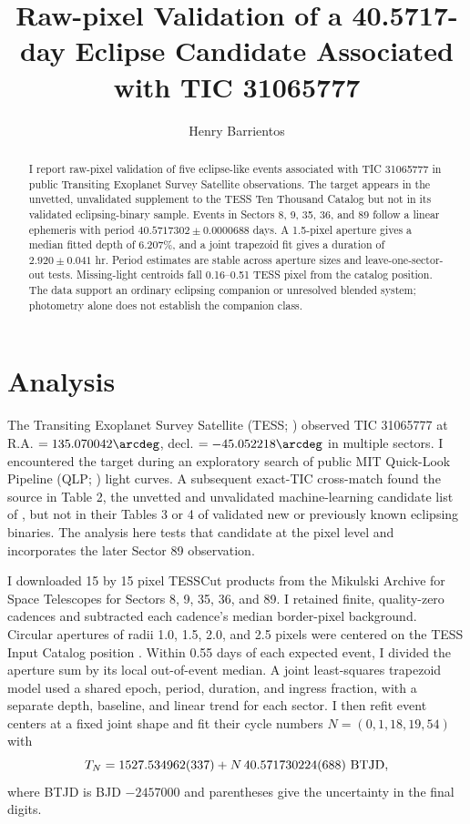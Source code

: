 \documentclass[default]{aastex702}
\begin{document}
\title{Raw-pixel Validation of a 40.5717-day Eclipse Candidate Associated with TIC 31065777}

\author[gname=Henry,sname=Barrientos]{Henry Barrientos}

\begin{abstract}
I report raw-pixel validation of five eclipse-like events associated with TIC 31065777 in public Transiting Exoplanet Survey Satellite observations. The target appears in the unvetted, unvalidated supplement to the TESS Ten Thousand Catalog but not in its validated eclipsing-binary sample. Events in Sectors 8, 9, 35, 36, and 89 follow a linear ephemeris with period $40.5717302 \pm 0.0000688$ days. A 1.5-pixel aperture gives a median fitted depth of 6.207\%, and a joint trapezoid fit gives a duration of $2.920 \pm 0.041$ hr. Period estimates are stable across aperture sizes and leave-one-sector-out tests. Missing-light centroids fall 0.16--0.51 TESS pixel from the catalog position. The data support an ordinary eclipsing companion or unresolved blended system; photometry alone does not establish the companion class.
\end{abstract}

\section{Analysis}

The Transiting Exoplanet Survey Satellite (TESS; \citealt{ricker2015}) observed TIC 31065777 at R.A. $=135.070042\arcdeg$, decl. $=-45.052218\arcdeg$ in multiple sectors. I encountered the target during an exploratory search of public MIT Quick-Look Pipeline (QLP; \citealt{huang2020}) light curves. A subsequent exact-TIC cross-match found the source in Table 2, the unvetted and unvalidated machine-learning candidate list of \citet{kostov2025}, but not in their Tables 3 or 4 of validated new or previously known eclipsing binaries. The analysis here tests that candidate at the pixel level and incorporates the later Sector 89 observation.

I downloaded 15 by 15 pixel TESSCut products from the Mikulski Archive for Space Telescopes for Sectors 8, 9, 35, 36, and 89. I retained finite, quality-zero cadences and subtracted each cadence's median border-pixel background. Circular apertures of radii 1.0, 1.5, 2.0, and 2.5 pixels were centered on the TESS Input Catalog position \citep{stassun2019}. Within 0.55 days of each expected event, I divided the aperture sum by its local out-of-event median. A joint least-squares trapezoid model used a shared epoch, period, duration, and ingress fraction, with a separate depth, baseline, and linear trend for each sector. I then refit event centers at a fixed joint shape and fit their cycle numbers $N=(0,1,18,19,54)$ with
\begin{equation}
T_N = 1527.534962(337) + N\,40.571730224(688)\ {\rm BTJD},
\end{equation}
where BTJD is BJD $-2457000$ and parentheses give the uncertainty in the final digits.
\end{document}
